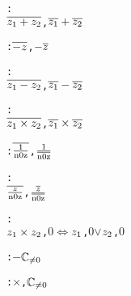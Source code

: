 \begin{alltt}
  : 
    \pvsid{(}\(\conjugateonefn{\opplustwofn{z\sb{1}}{z\sb{2}}}\), \(\opplustwofn{\conjugateonefn{z\sb{1}}}{\conjugateonefn{z\sb{2}}}\)\pvsid{)}\vspace*{\pvsdeclspacing}

  :  \pvsid{(}\(\conjugateonefn{\opdifferenceonefn{z}}\), \(\opdifferenceonefn{\conjugateonefn{z}}\)\pvsid{)}\vspace*{\pvsdeclspacing}

  : 
    \pvsid{(}\(\conjugateonefn{\opdifferencetwofn{z\sb{1}}{z\sb{2}}}\), \(\opdifferencetwofn{\conjugateonefn{z\sb{1}}}{\conjugateonefn{z\sb{2}}}\)\pvsid{)}\vspace*{\pvsdeclspacing}

  : 
    \pvsid{(}\(\conjugateonefn{\optimestwofn{z\sb{1}}{z\sb{2}}}\), \(\optimestwofn{\conjugateonefn{z\sb{1}}}{\conjugateonefn{z\sb{2}}}\)\pvsid{)}\vspace*{\pvsdeclspacing}

  :  \pvsid{(}\(\conjugateonefn{\opdividetwofn{1}{\pvsid{n0z}}}\), \(\opdividetwofn{1}{\conjugateonefn{\pvsid{n0z}}}\)\pvsid{)}\vspace*{\pvsdeclspacing}

  : 
    \pvsid{(}\(\conjugateonefn{\opdividetwofn{z}{\pvsid{n0z}}}\), \(\opdividetwofn{\conjugateonefn{z}}{\conjugateonefn{\pvsid{n0z}}}\)\pvsid{)}\vspace*{\pvsdeclspacing}

  : 
    \pvsid{(}\(\optimestwofn{z\sb{1}}{z\sb{2}}\), \(0\)\pvsid{)} \(\Leftrightarrow\) \pvsid{(}\(z\sb{1}\), \(0\)\pvsid{)} \(\vee\) \pvsid{(}\(z\sb{2}\), \(0\)\pvsid{)}\vspace*{\pvsdeclspacing}

  :  \(-\)\pvsid{(}\pvsid{)}  \({\pvssubscript{\mathbb{C}}{{\not=}0}}\)\vspace*{\pvsdeclspacing}

  :  \(\times\)\pvsid{(}, \pvsid{)}  \({\pvssubscript{\mathbb{C}}{{\not=}0}}\)\vspace*{\pvsdeclspacing}


\end{alltt}
